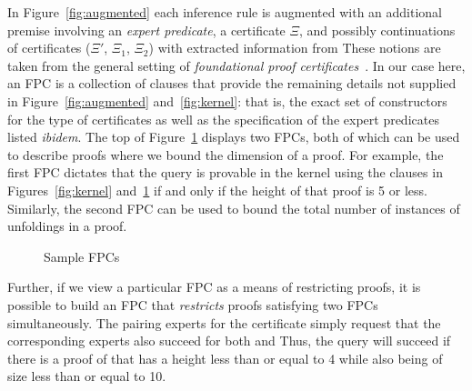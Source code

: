 In Figure~\ref{fig:augmented}  each
inference rule is augmented with an additional premise involving an
\emph{expert predicate}, a certificate $\Xi$, and possibly continuations of
certificates ($\Xi'$, $\Xi_1$, $\Xi_2$) with extracted information from
These notions are taken from the general setting of \emph{foundational
  proof certificates}~\cite{chihani17jar}.
%
In our case here, an FPC is a collection of \lP clauses that
provide the remaining details not supplied in Figure~\ref{fig:augmented} and~\ref{fig:kernel}:
that is, the exact set of constructors for the  type of certificates as
well as the specification of the expert predicates listed \emph{ibidem}.
%
The top of Figure~\ref{fig:resources} displays two FPCs,
both of which can be used to describe proofs where we bound
the dimension of  a proof.
%
For example, the first FPC dictates that the query \mbox{} is
provable in  the kernel using the clauses in Figures~\ref{fig:kernel}
and~\ref{fig:resources} if and only if the height of that proof is 5
or less.
%
Similarly, the second FPC can be used to bound the total number of instances of
unfoldings in a proof.
%

\begin{figure}[t]


\caption{Sample FPCs}
\label{fig:resources}
\end{figure}

Further, if we view a particular FPC as a means of restricting proofs, it is
possible to build an FPC that \emph{restricts} proofs satisfying two FPCs
simultaneously.
%
%
The pairing experts for the certificate  simply
request that the corresponding experts also succeed for both
 and  
%
Thus, the query 
will succeed if there is a proof of  that has a height less
than or equal to 4 while also being of size less than or equal to 10.


